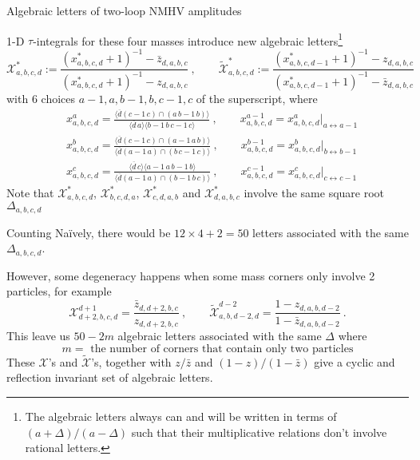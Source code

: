 \documentclass[10pt]{beamer}
\begin{document}
\begin{frame}{Algebraic letters of two-loop NMHV amplitudes}

\footnotesize{
  1-D $\tau$-integrals for these four masses introduce new algebraic letters\footnote{The algebraic letters always can and will be written in terms of $(a+\Delta)/(a-\Delta)$ such that their multiplicative relations don't involve rational letters.}
  \begin{equation*}
    \mathcal{X}_{a,b,c,d}^{\ast}:=\frac{(x^{\ast}_{a,b,c,d}+1)^{-1}-\bar{z}_{d,a,b,c}}{(x^{\ast}_{a,b,c,d}+1)^{-1}-z_{d,a,b,c}}\:, \qquad     
    \widetilde{\mathcal{X}}_{a,b,c,d}^{\ast}:=\frac{(x^{\ast}_{a,b,c,d-1}+1)^{-1}-z
    _{d,a,b,c}}{(x^{\ast}_{a,b,c,d-1}+1)^{-1}-\bar{z}_{d,a,b,c}}
\end{equation*}
with 6 choices $a{-}1,a,b{-}1,b,c{-}1,c$ of the superscript, where
\begin{align*}
    & x^{a}_{a,b,c,d}=\frac{\langle\overline{d} (c{-}1\,c)\cap(a\,b{-}1\,b) \rangle}{\langle \overline{d}\,a\rangle \langle b{-}1\,b\,c{-}1\,c\rangle} \:, \qquad x^{a-1}_{a,b,c,d}= x^{a}_{a,b,c,d}\vert_{a\leftrightarrow a{-}1}\\
    &x_{a,b,c,d}^{b}=\frac{\langle \overline{d} (c{-}1\,c)\cap (a{-}1\,a\,b)\rangle}{\langle \overline{d} (a{-}1\,a)\cap(b\,c{-}1\,c)\rangle} \:, \qquad x^{b-1}_{a,b,c,d}= x^{b}_{a,b,c,d}\vert_{b\leftrightarrow b{-}1} \\
    &x_{a,b,c,d}^{c}=\frac{\langle \overline{d}\,c\rangle\langle a{-}1\,a\,b{-}1\,b\rangle}{\langle \overline{d}(a{-}1\,a)\cap(b{-}1\,b\,c)\rangle} \:, \qquad x^{c-1}_{a,b,c,d}= x^{c}_{a,b,c,d}\vert_{c\leftrightarrow c{-}1}  \nonumber  
\end{align*}
Note that $\mathcal{X}_{a,b,c,d}^{\ast}$, $\mathcal{X}_{b,c,d,a}^{\ast}$, $\mathcal{X}_{c,d,a,b}^{\ast}$ and $\mathcal{X}_{d,a,b,c}^{\ast}$ involve the same square root $\Delta_{a,b,c,d}$

}

\end{frame}

\begin{frame}{Counting}
  Na\"{i}vely, there would be $12\times 4 +2 =50$ letters associated with the same $\Delta_{a,b,c,d}$. 

  However, some degeneracy happens when some mass corners only involve 2 particles, for example
  \[
    \mathcal{X}_{d+2,b,c,d}^{d+1}=\frac{\bar{z}_{d,d+2,b,c}}{z_{d,d+2,b,c}}\:,\qquad 
    \widetilde{\mathcal{X}}_{a,b,d-2,d}^{d-2}=\frac{1-z_{d,a,b,d-2}}{1-\bar{z}_{d,a,b,d-2}} \:.
  \]
  This leave us $50-2m$ algebraic letters associated with the same $\Delta$ where 
  \[
  m= \text{ the number of corners that contain only two particles}
  \]
  These $\mathcal{X}$'s and $\widetilde{\mathcal{X}}$'s, together with $z/\bar{z}$ and $(1-z)/(1-\bar{z})$ give a cyclic and reflection invariant set of algebraic letters. %
  
\end{frame}
\end{document}
